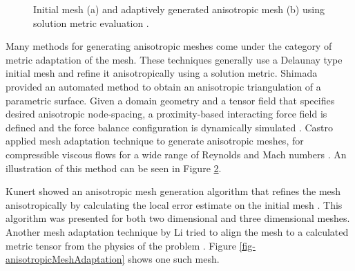 \begin{figure}
\begin{minipage}[b]{.55\textwidth}
\begin{subfigure}{\linewidth}
		\caption{}
	\label{fig-castro}
	\end{subfigure}
	\caption[Adaptively refined mesh using solution metric evaluation \cite{castro1997anisotropic}]{Initial mesh (a) and adaptively generated anisotropic mesh (b) using solution metric evaluation	\cite{castro1997anisotropic}.}
\end{minipage}
\end{figure}

Many methods for generating anisotropic meshes come under the category of metric adaptation of the mesh. These techniques generally use a Delaunay type initial mesh and refine it anisotropically using a solution metric. Shimada \etal provided an automated method to obtain an anisotropic triangulation of a parametric surface. Given a domain geometry and a tensor field that specifies desired anisotropic node-spacing, a proximity-based interacting force field is defined and the force balance configuration is dynamically simulated \cite{shimada1997anisotropic}. Castro \etal applied mesh adaptation technique to generate anisotropic meshes, for compressible viscous flows for a wide range of Reynolds and Mach numbers \cite{castro1997anisotropic}. An illustration of this method can be seen in Figure \ref{fig-castro}. 

Kunert \etal showed an anisotropic mesh generation algorithm that refines the mesh anisotropically by calculating the local error estimate on the initial mesh \cite{kunert2002toward}. This algorithm was presented for both two dimensional and three dimensional meshes. Another mesh adaptation technique by Li \etal tried to align the mesh to a calculated metric tensor from the physics of the problem \cite{li2010anisotropic}. Figure \ref{fig-anisotropicMeshAdaptation} shows one such mesh.

